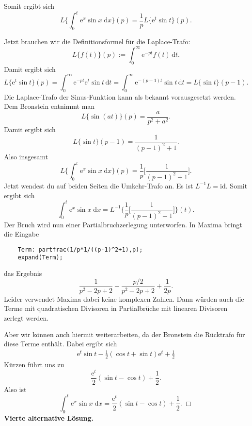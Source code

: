 \documentclass[a4paper,10pt,fleqn,twoside]{scrartcl}
\numberwithin{equation}{section}
\newcommand{\ee}{\mathrm e}
\newcommand{\strong}[1]{{\sf\bfseries #1}}
\theoremstyle{Aufgabe}
\begin{document}
Somit ergibt sich
\begin{equation}
L\bigg\{\int_0^t \ee^x\sin x\;\mathrm dx\bigg\}(p)
=\frac{1}{p}L\{\ee^t\sin t\}(p).
\end{equation}

Jetzt brauchen wir die Definitionsformel für die
Laplace-Trafo:
\begin{equation}
L\{f(t)\}(p):=\int_0^{\infty} \ee^{-pt}f(t)\,\mathrm dt.
\end{equation}
Damit ergibt sich
\begin{equation}
L\{\ee^t\sin t\}(p)
= \int_0^{\infty} \ee^{-pt}\ee^t\sin t\,\mathrm dt
= \int_0^{\infty} \ee^{-(p-1)t}\sin t\,\mathrm dt
= L\{\sin t\}(p-1).
\end{equation}
Die Laplace-Trafo der Sinus-Funktion kann als bekannt
vorausgesetzt werden. Dem Bronstein entnimmt man
\begin{equation}
L\{\sin(at)\}(p) = \frac{a}{p^2+a^2}.
\end{equation}
Damit ergibt sich
\begin{equation}
L\{\sin t\}(p-1) = \frac{1}{(p-1)^2+1}.
\end{equation}
Also insgesamt
\begin{equation}
L\bigg\{\int_0^t \ee^x\sin x\;\mathrm dx\bigg\}(p)
= \frac{1}{p}\bigg[\frac{1}{(p-1)^2+1}\bigg].
\end{equation}
Jetzt wendest du auf beiden Seiten die Umkehr-Trafo an. Es ist
$L^{-1}L=\mathrm{id}$. Somit ergibt sich%
\begin{equation}
\int_0^t \ee^x\sin x\;\mathrm dx
= L^{-1}\bigg\{\frac{1}{p}\bigg[\frac{1}{(p-1)^2+1}\bigg]\bigg\}(t).
\end{equation}
Der Bruch wird nun einer Partialbruchzerlegung unterworfen.
In Maxima bringt die Eingabe
\begin{verbatim}
    Term: partfrac(1/p*1/((p-1)^2+1),p);
    expand(Term);
\end{verbatim}
das Ergebnis
\begin{equation}
\frac{1}{p^2-2p+2}-\frac{p/2}{p^2-2p+2}+\frac{1}{2p}.
\end{equation}
Leider verwendet Maxima dabei keine komplexen Zahlen. Dann würden
auch die Terme mit quadratischen Divisoren in Partialbrüche
mit linearen Divisoren zerlegt werden.

Aber wir können auch hiermit weiterarbeiten, da der Bronstein
die Rücktrafo für diese Terme enthält. Dabei ergibt sich
\begin{gather*}
\ee^t\sin t - \frac{1}{2}(\cos t+\sin t)\ee^t + \frac{1}{2}
\end{gather*}
Kürzen führt uns zu
\begin{equation}
\frac{\ee^t}{2}(\sin t-\cos t)+\frac{1}{2}.
\end{equation}
Also ist
\begin{equation}
\int_0^t \ee^x\sin x\;\mathrm dx
= \frac{\ee^t}{2}(\sin t-\cos t)+\frac{1}{2}.\;\Box
\end{equation}
%
\strong{Vierte alternative Lösung.}
\end{document}
